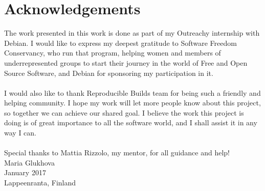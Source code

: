 \section*{Acknowledgements}

The work presented in this work is done as part of my Outreachy internship
with Debian. I would like to express my deepest gratitude to Software Freedom
Conservancy, who run that program, helping women and members of
underrepresented groups to start their journey in the world of Free and Open
Source Software, and Debian for sponsoring my participation in it.\\\\
I would also like to thank Reproducible Builds team for being such a
friendly and helping community. I hope my work will let more people
know about this project, so together we can achieve our shared goal.
I believe the work this project is doing is of great importance to all
the software world, and I shall assist it in any way I can.\\\\
Special thanks to Mattia Rizzolo, my mentor, for all guidance and help!\\

Maria Glukhova\\
January 2017\\
Lappeenranta, Finland\\
